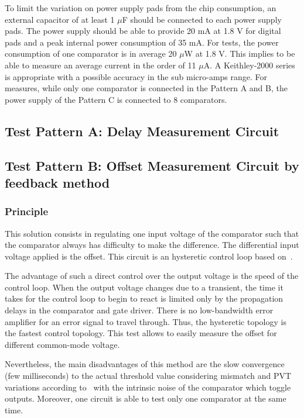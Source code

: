 To limit the variation on power supply pads from the chip consumption, an external capacitor of at least 1 $\mu$F should be connected to each power supply pads. The power supply should be able to provide 20 mA at 1.8 V for digital pads and a peak internal power consumption of 35 mA. For tests, the power consumption of one comparator is in average 20 $\mu$W at 1.8 V. This implies to be able to measure an average current in the order of 11 $\mu$A. A Keithley-2000 series is appropriate with a possible accuracy in the sub micro-amps range. For measures, while only one comparator is connected in the Pattern A and B, the power supply of the Pattern C is connected to 8 comparators.

\subsection{Test Pattern A: Delay Measurement Circuit}



\subsection{Test Pattern B: Offset Measurement Circuit by feedback method}
\subsubsection{Principle}
This solution consists in regulating one input voltage of the comparator such that the comparator always has difficulty to make the difference. The differential input voltage applied is the offset. This circuit is an hysteretic control loop based on~\cite{1594475}.

The advantage of such a direct control over the output voltage is the speed of the control loop. When the output voltage changes due to a transient, the time it takes for the control loop to begin to react is limited only by the propagation delays in the comparator and gate driver. There is no low-bandwidth error amplifier for an error signal to travel through. Thus, the hysteretic topology is the fastest control topology. This test allows to easily measure the offset for different common-mode voltage.

Nevertheless, the main disadvantages of this method are the slow convergence (few milliseconds) to the actual threshold value considering mismatch and PVT variations according to~\cite{7050041} with the intrinsic noise of the comparator which toggle outputs. Moreover, one circuit is able to test only one comparator at the same time.


